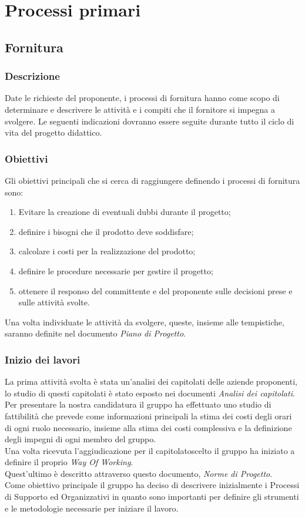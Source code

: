 \section{Processi primari} 

\subsection{Fornitura} 
\subsubsection{Descrizione}
Date le richieste del proponente, i processi di fornitura hanno come scopo di determinare e descrivere le attività e i compiti che il fornitore si impegna a svolgere.
Le seguenti indicazioni dovranno essere seguite durante tutto il ciclo di vita del progetto didattico.

\subsubsection{Obiettivi} 
Gli obiettivi principali che si cerca di raggiungere definendo i processi di fornitura sono: 
\begin{enumerate}
    \item Evitare la creazione di eventuali dubbi durante il progetto; 
    \item definire i bisogni che il prodotto deve soddisfare; 
    \item calcolare i costi per la realizzazione del prodotto; 
    \item definire le procedure necessarie per gestire il progetto; 
    \item ottenere il responso del committente e del proponente sulle decisioni prese e sulle attività svolte.
\end{enumerate}
Una volta individuate le attività da svolgere, queste, insieme alle tempistiche, 
saranno definite nel documento \textit{Piano di Progetto}.


\subsubsection{Inizio dei lavori} 
La prima attività svolta è stata un'analisi dei capitolati delle aziende proponenti, lo studio di questi capitolati è stato esposto nei documenti \textit{Analisi dei capitolati}. \\
Per presentare la nostra candidatura il gruppo ha effettuato uno studio di fattibilità che 
prevede come informazioni principali la stima dei costi degli orari di ogni ruolo necessario, 
insieme alla stima dei costi complessiva e la definizione degli impegni di ogni membro del gruppo. \\
Una volta ricevuta l'aggiudicazione per il capitolato\glo scelto il gruppo ha iniziato a definire il proprio \textit{Way Of Working}. \\
Quest'ultimo è descritto attraverso questo documento, \textit{Norme di Progetto}. \\
Come obiettivo principale il gruppo ha deciso di descrivere inizialmente i Processi di Supporto ed Organizzativi in quanto sono 
importanti per definire gli strumenti e le metodologie necessarie per iniziare il lavoro. 


